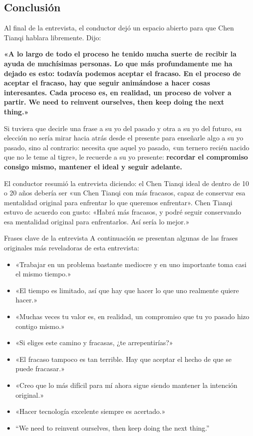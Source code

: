 \documentclass[a4paper]{article}
\begin{document}
\subsection{Conclusión}

Al final de la entrevista, el conductor dejó un espacio abierto para que Chen Tianqi hablara libremente. Dijo:

\textbf{«A lo largo de todo el proceso he tenido mucha suerte de recibir la ayuda de muchísimas personas. Lo que más profundamente me ha dejado es esto: todavía podemos aceptar el fracaso. En el proceso de aceptar el fracaso, hay que seguir animándose a hacer cosas interesantes. Cada proceso es, en realidad, un proceso de volver a partir. We need to reinvent ourselves, then keep doing the next thing.»}

Si tuviera que decirle una frase a su yo del pasado y otra a su yo del futuro, su elección no sería mirar hacia atrás desde el presente para enseñarle algo a su yo pasado, sino al contrario: necesita que aquel yo pasado, «un ternero recién nacido que no le teme al tigre», le recuerde a su yo presente: \textbf{recordar el compromiso consigo mismo, mantener el ideal y seguir adelante.}

El conductor resumió la entrevista diciendo: el Chen Tianqi ideal de dentro de 10 o 20 años debería ser «un Chen Tianqi con más fracasos, capaz de conservar esa mentalidad original para enfrentar lo que queremos enfrentar». Chen Tianqi estuvo de acuerdo con gusto: «Habrá más fracasos, y podré seguir conservando esa mentalidad original para enfrentarlos. Así sería lo mejor.»

\begin{importantbox}{Frases clave de la entrevista}
A continuación se presentan algunas de las frases originales más reveladoras de esta entrevista:
\begin{itemize}
    \item «Trabajar en un problema bastante mediocre y en uno importante toma casi el mismo tiempo.»
    \item «El tiempo es limitado, así que hay que hacer lo que uno realmente quiere hacer.»
    \item «Muchas veces tu valor es, en realidad, un compromiso que tu yo pasado hizo contigo mismo.»
    \item «Si eliges este camino y fracasas, ¿te arrepentirías?»
    \item «El fracaso tampoco es tan terrible. Hay que aceptar el hecho de que se puede fracasar.»
    \item «Creo que lo más difícil para mí ahora sigue siendo mantener la intención original.»
    \item «Hacer tecnología excelente siempre es acertado.»
    \item ``We need to reinvent ourselves, then keep doing the next thing.''
\end{itemize}
\end{importantbox}
\end{document}
